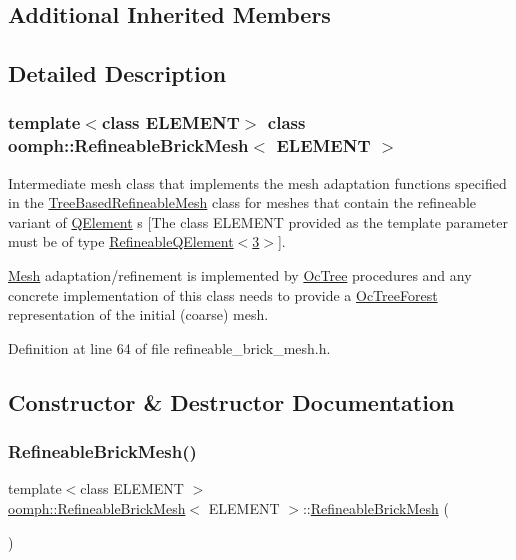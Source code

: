 \subsection*{Additional Inherited Members}


\subsection{Detailed Description}
\subsubsection*{template$<$class E\+L\+E\+M\+E\+NT$>$\newline
class oomph\+::\+Refineable\+Brick\+Mesh$<$ E\+L\+E\+M\+E\+N\+T $>$}

Intermediate mesh class that implements the mesh adaptation functions specified in the \hyperlink{classoomph_1_1TreeBasedRefineableMesh}{Tree\+Based\+Refineable\+Mesh} class for meshes that contain the refineable variant of \hyperlink{classoomph_1_1QElement}{Q\+Element} s \mbox{[}The class E\+L\+E\+M\+E\+NT provided as the template parameter must be of type \hyperlink{classoomph_1_1RefineableQElement_3_013_01_4}{Refineable\+Q\+Element$<$3$>$}\mbox{]}.

\hyperlink{classoomph_1_1Mesh}{Mesh} adaptation/refinement is implemented by \hyperlink{classoomph_1_1OcTree}{Oc\+Tree} procedures and any concrete implementation of this class needs to provide a \hyperlink{classoomph_1_1OcTreeForest}{Oc\+Tree\+Forest} representation of the initial (coarse) mesh. 

Definition at line 64 of file refineable\+\_\+brick\+\_\+mesh.\+h.



\subsection{Constructor \& Destructor Documentation}
\mbox{\label{classoomph_1_1RefineableBrickMesh_a8812801e58475d1296b08f7891c9287d}} 
\subsubsection{\texorpdfstring{Refineable\+Brick\+Mesh()}{RefineableBrickMesh()}\hspace{0.1cm}{\footnotesize\ttfamily [1/2]}}
{\footnotesize\ttfamily template$<$class E\+L\+E\+M\+E\+NT $>$ \\
\hyperlink{classoomph_1_1RefineableBrickMesh}{oomph\+::\+Refineable\+Brick\+Mesh}$<$ E\+L\+E\+M\+E\+NT $>$\+::\hyperlink{classoomph_1_1RefineableBrickMesh}{Refineable\+Brick\+Mesh} (\begin{DoxyParamCaption}{ }\end{DoxyParamCaption})\hspace{0.3cm}{\ttfamily [inline]}}



